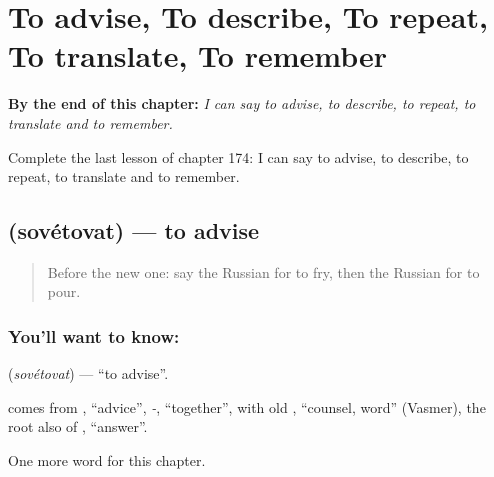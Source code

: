 
\chapter{To advise, To describe, To repeat, To translate, To remember}
\label{ch:ru-to-advise-to-describe-to-repeat-to-translate-to-remember}

\begin{chapteropening}
\textbf{By the end of this chapter:} \emph{I can say to advise, to describe, to repeat, to translate and to remember.}

Complete the last lesson of chapter 174: I can say to advise, to describe, to repeat, to translate and to remember.
\end{chapteropening}

\section[\texorpdfstring{\ru{советовать} (sovétovat)}{советовать (sovétovat)}]{ (sovétovat) — to advise}

\label{lesson:RU-C174-sovetovat}



\begin{quote}
Before the new one: say the Russian for to fry, then the Russian for to pour.
\end{quote}

\subsection*{You'll want to know: }
\textbf{} (\emph{sovétovat}) — \textquotedblleft{}to advise\textquotedblright{}.

\begin{cousinweb}
\textbf{} comes from \emph{}, \textquotedblleft{}advice\textquotedblright{}, \emph{-}, \textquotedblleft{}together\textquotedblright{}, with old \emph{}, \textquotedblleft{}counsel, word\textquotedblright{} (Vasmer), the root also of \emph{}, \textquotedblleft{}answer\textquotedblright{}.
\end{cousinweb}

\begin{grammarlens}[title={What you've built}]
One more word for this chapter.
\end{grammarlens}

